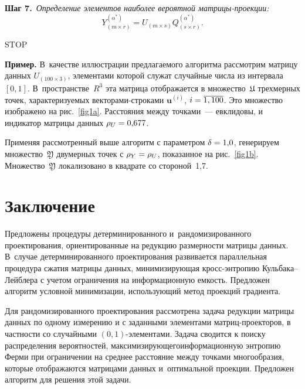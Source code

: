 \begin{multicols}{2}
\noindent
\textbf{Шаг 7.}\ \textit{Определение элементов наиболее вероятной 
мат\-ри\-цы-про\-ек\-ции:}
$$
Y^{(\alpha^*)}_{(m \times r)} = U_{(m \times s)} Q^{(\alpha^*)}_{(s \times 
r)}.
$$

\noindent
{STOP} 

\smallskip

\noindent
\textbf{Пример.} В~качестве иллюстрации предлагаемого алгоритма рассмотрим 
матрицу данных $U_{(100 \times 3)}$, элементами которой служат случайные 
числа из интервала $[0,1]$. В~пространстве~$R^3$ эта матрица отображается в 
множество~$\mathfrak{U}$ трехмерных точек, характеризуемых векторами-строками 
$\mathbf{u}^{(i)}$, $i \hm= \overline{1,100}$. Это множество изображено на 
рис.~\ref{fig1a}.
Расстояния между точками~--- евклидовы, и индикатор матрицы данных $\rho_U 
\hm= 0{,}677$.

Применяя рассмотренный выше алгоритм с параметром $\delta \hm= 1{,}0$, 
генерируем множество~$\mathfrak{Y}$ двумерных точек с $\rho_Y \hm= \rho_U$, 
показанное на рис.~\ref{fig1b}. Множество~$\mathfrak{Y}$ локализовано в 
квадрате со стороной~1,7.



\section{Заключение}

Предложены процедуры детерминированного и~рандомизированного проектирования, 
ориентированные на редукцию размерности матрицы данных. В~случае 
детерминированного проектирова\-ния развивается параллельная процедура сжатия 
матрицы данных, минимизирующая кросс-энт\-ро\-пию Куль\-ба\-ка--Лейб\-ле\-ра с 
учетом ограничения на информационную емкость.  Предложен алгоритм условной 
минимизации, использующий метод проекций градиента.

Для рандомизированного проектирования рассмотрена задача редукции матрицы 
данных по одному измерению и с заданными элементами 
мат\-риц-про\-ек\-то\-ров, в частности со случайными\linebreak
 $(0,1)$-эле\-мен\-та\-ми. Задача сводится к 
поиску распределения вероятностей, максимизирующего\linebreak информационную энтропию 
Ферми при ограничении на среднее расстояние между точками многообразия, 
которые отображаются матрицами данных и~оптимальной проекции. Предложен 
алгоритм для решения этой задачи.

{\small\frenchspacing
 {%
 \begin{thebibliography}{99}


\end{thebibliography}}}
\end{multicols}
